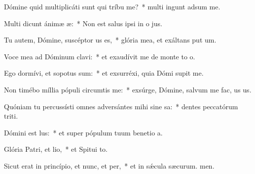 \item Dómine quid multiplicáti sunt qui tríbu me?~* multi ingunt adsum me.
\item Multi dicunt ánimæ æ:~* Non est salus ipsi in o jus.
\item Tu autem, Dómine, suscéptor us es,~* glória mea, et exáltans put um.
\item Voce mea ad Dóminum clavi:~* et exaudívit me de monte to o.
\item Ego dormívi, et sopotus sum:~* et exsurréxi, quia Dómi supit me.
\item Non timébo míllia pópuli circumtis me:~* exsúrge, Dómine, salvum me fac, us us.
\item Quóniam tu percussísti omnes adversántes mihi sine sa:~* dentes peccatórum triti.
\item Dómini est lus:~* et super pópulum tuum benetio a.
\item Glória Patri, et lio,~* et Spitui to.
\item Sicut erat in princípio, et nunc, et per,~* et in sǽcula sæcurum. men.
